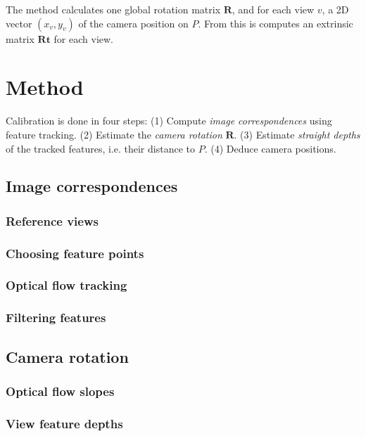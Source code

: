 \documentclass{scrreprt}
\newcommand{\matr}[1]{\mathbf{#1}}
\begin{document}
The method calculates one global rotation matrix $\matr{R}$, and for each view $v$, a 2D vector $(x_v, y_v)$ of the camera position on $P$. From this is computes an extrinsic matrix $\matr{Rt}$ for each view.
 
\chapter{Method}
Calibration is done in four steps: (1) Compute \emph{image correspondences} using feature tracking. (2) Estimate the \emph{camera rotation} $\matr{R}$. (3) Estimate \emph{straight depths} of the tracked features, i.e. their distance to $P$. (4) Deduce camera positions.
 
\section{Image correspondences}

\subsection{Reference views}

\subsection{Choosing feature points}

\subsection{Optical flow tracking}

\subsection{Filtering features}


\section{Camera rotation}

\subsection{Optical flow slopes}

\subsection{View feature depths}
\end{document}
